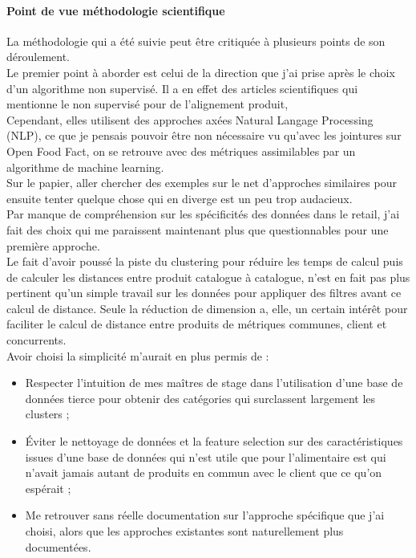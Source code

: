 \documentclass{rapportCS}
\begin{document}
\paragraph{Point de vue méthodologie scientifique}
La méthodologie qui a été suivie peut être critiquée à plusieurs points de son déroulement.\\
Le premier point à aborder est celui de la direction que j'ai prise après le choix
d'un algorithme non supervisé.
Il a en effet des articles scientifiques qui mentionne le non supervisé pour de l'alignement
produit, \cite[cf ces articles.]{akritidis_clustering-based_2019,ristoski_machine_2018,kaul_automatic_nodate,akritidis_effective_2018}
\\
Cependant, elles utilisent des approches axées Natural Langage Processing (NLP), ce que je pensais 
pouvoir être non nécessaire vu qu'avec les jointures sur Open Food Fact, on se retrouve
avec des métriques assimilables par un algorithme de machine learning.\\

Sur le papier, aller chercher des exemples sur le net d'approches similaires pour ensuite 
tenter quelque chose qui en diverge est un peu trop audacieux.\\
Par manque de compréhension sur les spécificités des données dans le retail, j'ai
fait des choix qui me paraissent maintenant plus que questionnables pour une
première approche.\\
Le fait d'avoir poussé la piste du clustering pour réduire les temps de calcul puis
de calculer les distances entre produit catalogue à catalogue,
n'est en fait pas plus pertinent qu'un simple travail sur les données pour appliquer des 
filtres avant ce calcul de distance. Seule la réduction de dimension a, elle, un certain
intérêt pour faciliter le calcul de distance entre produits de métriques communes,
client et concurrents.\\

Avoir choisi la simplicité m'aurait en plus permis de :
\begin{itemize}
  \item Respecter l'intuition de mes maîtres de stage dans l'utilisation d'une base
  de données tierce pour obtenir des catégories qui surclassent largement les clusters ;
  \item Éviter le nettoyage de données et la feature selection sur des caractéristiques
  issues d'une base de données qui n'est utile que pour l'alimentaire est qui n'avait
  jamais autant de produits en commun avec le client que ce qu'on espérait ;
  \item Me retrouver sans réelle documentation sur l'approche spécifique que j'ai choisi,
  alors que les approches existantes sont naturellement plus documentées.
\end{itemize}
\end{document}
